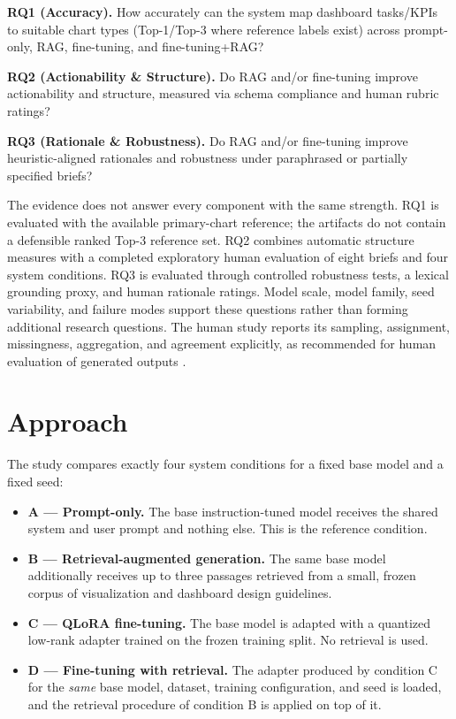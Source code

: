 \textbf{RQ1 (Accuracy).} How accurately can the system map dashboard tasks/KPIs to suitable chart types (Top-1/Top-3 where reference labels exist) across prompt-only, RAG, fine-tuning, and fine-tuning+RAG?

\textbf{RQ2 (Actionability \& Structure).} Do RAG and/or fine-tuning improve actionability and structure, measured via schema compliance and human rubric ratings?

\textbf{RQ3 (Rationale \& Robustness).} Do RAG and/or fine-tuning improve heuristic-aligned rationales and robustness under paraphrased or partially specified briefs?

The evidence does not answer every component with the same strength. RQ1 is evaluated with the available primary-chart reference; the artifacts do not contain a defensible ranked Top-3 reference set. RQ2 combines automatic structure measures with a completed exploratory human evaluation of eight briefs and four system conditions. RQ3 is evaluated through controlled robustness tests, a lexical grounding proxy, and human rationale ratings. Model scale, model family, seed variability, and failure modes support these questions rather than forming additional research questions. The human study reports its sampling, assignment, missingness, aggregation, and agreement explicitly, as recommended for human evaluation of generated outputs \cite{vanderlee2019human}.

\section{Approach}

The study compares exactly four system conditions for a fixed base model and a fixed seed:

\begin{itemize}
\tightlist
\item
  \textbf{A --- Prompt-only.} The base instruction-tuned model receives the shared system and user prompt and nothing else. This is the reference condition.
\item
  \textbf{B --- Retrieval-augmented generation.} The same base model additionally receives up to three passages retrieved from a small, frozen corpus of visualization and dashboard design guidelines.
\item
  \textbf{C --- QLoRA fine-tuning.} The base model is adapted with a quantized low-rank adapter trained on the frozen training split. No retrieval is used.
\item
  \textbf{D --- Fine-tuning with retrieval.} The adapter produced by condition C for the \emph{same} base model, dataset, training configuration, and seed is loaded, and the retrieval procedure of condition B is applied on top of it.
\end{itemize}

